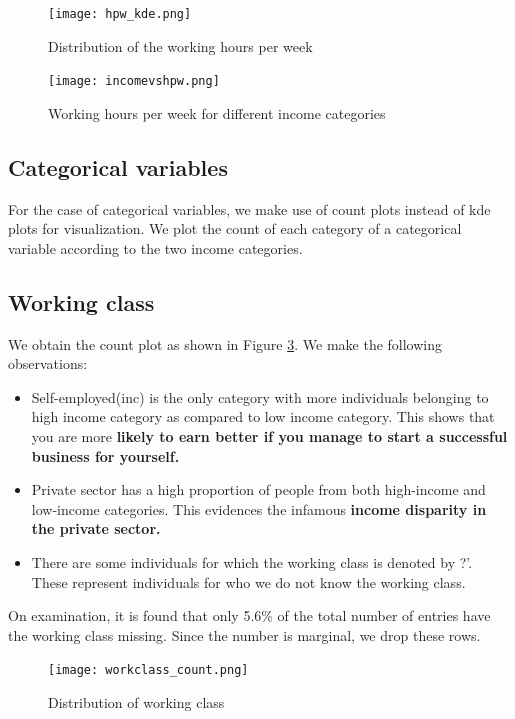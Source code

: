 \documentclass[conference]{IEEEtran}
\begin{document}
\begin{figure}[tbh]
\centering
\texttt{[image: hpw\_kde.png]}
\caption{Distribution of the working hours per week}
\label{hpw_kde}
\end{figure}

\begin{figure}[tbh]
\centering
\texttt{[image: incomevshpw.png]}
\caption{Working hours per week for different income categories}
\label{incomevshpw}
\end{figure}


\subsection*{Categorical variables}

For the case of categorical variables, we make use of count plots instead of kde plots for visualization. We plot the count of each category of a categorical variable according to the two income categories.

\subsection*{Working class}

We obtain the count plot as shown in Figure \ref{workclass_count}. We make the following observations:

\begin{itemize}
    \item Self-employed(inc) is the only category with more individuals belonging to high income category as compared to low income category. This shows that  you are more \textbf{likely to earn better if you manage to start a successful business for yourself.}
    \item Private sector has a high proportion of people from both high-income and low-income categories. This evidences the infamous \textbf{income disparity in the private sector.}
    \item There are some individuals for which the working class is denoted by ?'. These represent individuals for who we do not know the working class.
\end{itemize}

On examination, it is found that only 5.6\% of the total number of entries have the working class missing. Since the number is marginal, we drop these rows.

\begin{figure}[tbh]
\centering
\texttt{[image: workclass\_count.png]}
\caption{Distribution of working class }
\label{workclass_count}
\end{figure}
\end{document}
